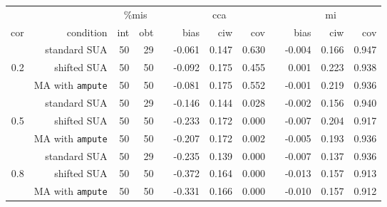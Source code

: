 \documentclass[]{interact}
\newcommand{\code}[1]{\texttt{#1}}
\begin{document}
\begin{table}
{\begin{tabular}{rrrrrrrrrrrr}
\hline
&& \multicolumn{2}{c}{\%mis} && \multicolumn{3}{c}{cca} && \multicolumn{3}{c}{mi} \\
\cline{3-4} \cline{6-8} \cline{10-12}
cor & condition & int & obt & & bias & ciw & cov & & bias & ciw & cov \\ 
\hline
 & standard SUA & 50 & 29 &  & -0.061 & 0.147 & 0.630 &  & -0.004 & 0.166 & 0.947 \\ 
  0.2 & shifted SUA & 50 & 50 &  & -0.092 & 0.175 & 0.455 &  & 0.001 & 0.223 & 0.938 \\ 
   & MA with \code{ampute} & 50 & 50 &  & -0.081 & 0.175 & 0.552 &  & -0.001 & 0.219 & 0.936 \\ 
   \cline{2-12}
   & standard SUA & 50 & 29 &  & -0.146 & 0.144 & 0.028 &  & -0.002 & 0.156 & 0.940 \\ 
  0.5 & shifted SUA & 50 & 50 &  & -0.233 & 0.172 & 0.000 &  & -0.007 & 0.204 & 0.917 \\ 
   & MA with \code{ampute} & 50 & 50 &  & -0.207 & 0.172 & 0.002 &  & -0.005 & 0.193 & 0.936 \\ 
   \cline{2-12}
   & standard SUA & 50 & 29 &  & -0.235 & 0.139 & 0.000 &  & -0.007 & 0.137 & 0.936 \\ 
  0.8 & shifted SUA & 50 & 50 &  & -0.372 & 0.164 & 0.000 &  & -0.013 & 0.157 & 0.913 \\ 
   & MA with \code{ampute} & 50 & 50 &  & -0.331 & 0.166 & 0.000 &  & -0.010 & 0.157 & 0.912 \\ 
   \hline
\end{tabular}}
  \label{sim2a}
\end{table}  
  
\end{document}
